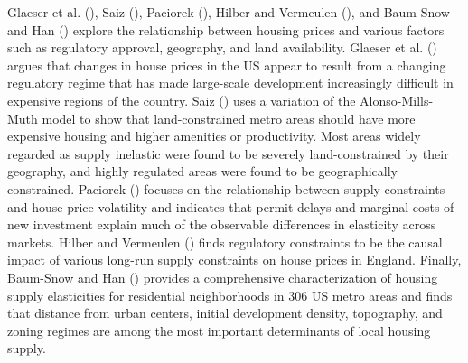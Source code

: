\documentclass[
  12pt,
]{article}
\begin{document}
Glaeser et al. (), Saiz (), Paciorek (), Hilber and Vermeulen (), and Baum-Snow and Han () explore the relationship between housing prices and various factors such as regulatory approval, geography, and land availability. Glaeser et al. () argues that changes in house prices in the US appear to result from a changing regulatory regime that has made large-scale development increasingly difficult in expensive regions of the country. Saiz () uses a variation of the Alonso-Mills-Muth model to show that land-constrained metro areas should have more expensive housing and higher amenities or productivity. Most areas widely regarded as supply inelastic were found to be severely land-constrained by their geography, and highly regulated areas were found to be geographically constrained. Paciorek () focuses on the relationship between supply constraints and house price volatility and indicates that permit delays and marginal costs of new investment explain much of the observable differences in elasticity across markets. Hilber and Vermeulen () finds regulatory constraints to be the causal impact of various long-run supply constraints on house prices in England. Finally, Baum-Snow and Han () provides a comprehensive characterization of housing supply elasticities for residential neighborhoods in 306 US metro areas and finds that distance from urban centers, initial development density, topography, and zoning regimes are among the most important determinants of local housing supply.
\end{document}
